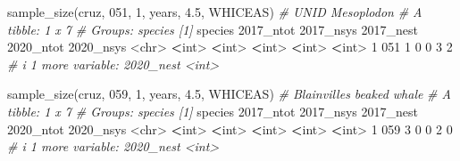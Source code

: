 \documentclass[
]{book}
\newenvironment{Shaded}{\begin{snugshade}}{\end{snugshade}}
\newcommand{\AttributeTok}[1]{\textcolor[rgb]{0.77,0.63,0.00}{#1}}
\newcommand{\CommentTok}[1]{\textcolor[rgb]{0.56,0.35,0.01}{\textit{#1}}}
\newcommand{\DecValTok}[1]{\textcolor[rgb]{0.00,0.00,0.81}{#1}}
\newcommand{\ErrorTok}[1]{\textcolor[rgb]{0.64,0.00,0.00}{\textbf{#1}}}
\newcommand{\FloatTok}[1]{\textcolor[rgb]{0.00,0.00,0.81}{#1}}
\newcommand{\FunctionTok}[1]{\textcolor[rgb]{0.00,0.00,0.00}{#1}}
\newcommand{\NormalTok}[1]{#1}
\newcommand{\SpecialCharTok}[1]{\textcolor[rgb]{0.00,0.00,0.00}{#1}}
\newcommand{\StringTok}[1]{\textcolor[rgb]{0.31,0.60,0.02}{#1}}
\begin{document}
\begin{Shaded}
\begin{Highlighting}[]
\FunctionTok{sample\_size}\NormalTok{(cruz, }\StringTok{\textquotesingle{}051\textquotesingle{}}\NormalTok{, }\DecValTok{1}\NormalTok{, years, }\FloatTok{4.5}\NormalTok{, }\StringTok{\textquotesingle{}WHICEAS\textquotesingle{}}\NormalTok{) }\CommentTok{\# UNID Mesoplodon}
\CommentTok{\# A tibble: 1 x 7}
\CommentTok{\# Groups:   species [1]}
\NormalTok{  species }\StringTok{\textasciigrave{}}\AttributeTok{2017\_ntot}\StringTok{\textasciigrave{}} \StringTok{\textasciigrave{}}\AttributeTok{2017\_nsys}\StringTok{\textasciigrave{}} \StringTok{\textasciigrave{}}\AttributeTok{2017\_nest}\StringTok{\textasciigrave{}} \StringTok{\textasciigrave{}}\AttributeTok{2020\_ntot}\StringTok{\textasciigrave{}} \StringTok{\textasciigrave{}}\AttributeTok{2020\_nsys}\StringTok{\textasciigrave{}}
  \SpecialCharTok{\textless{}}\NormalTok{chr}\SpecialCharTok{\textgreater{}}         \ErrorTok{\textless{}}\NormalTok{int}\SpecialCharTok{\textgreater{}}       \ErrorTok{\textless{}}\NormalTok{int}\SpecialCharTok{\textgreater{}}       \ErrorTok{\textless{}}\NormalTok{int}\SpecialCharTok{\textgreater{}}       \ErrorTok{\textless{}}\NormalTok{int}\SpecialCharTok{\textgreater{}}       \ErrorTok{\textless{}}\NormalTok{int}\SpecialCharTok{\textgreater{}}
\DecValTok{1} \DecValTok{051}               \DecValTok{1}           \DecValTok{0}           \DecValTok{0}           \DecValTok{3}           \DecValTok{2}
\CommentTok{\# i 1 more variable: \textasciigrave{}2020\_nest\textasciigrave{} \textless{}int\textgreater{}}

\FunctionTok{sample\_size}\NormalTok{(cruz, }\StringTok{\textquotesingle{}059\textquotesingle{}}\NormalTok{, }\DecValTok{1}\NormalTok{, years, }\FloatTok{4.5}\NormalTok{, }\StringTok{\textquotesingle{}WHICEAS\textquotesingle{}}\NormalTok{) }\CommentTok{\# Blainville\textquotesingle{}s beaked whale}
\CommentTok{\# A tibble: 1 x 7}
\CommentTok{\# Groups:   species [1]}
\NormalTok{  species }\StringTok{\textasciigrave{}}\AttributeTok{2017\_ntot}\StringTok{\textasciigrave{}} \StringTok{\textasciigrave{}}\AttributeTok{2017\_nsys}\StringTok{\textasciigrave{}} \StringTok{\textasciigrave{}}\AttributeTok{2017\_nest}\StringTok{\textasciigrave{}} \StringTok{\textasciigrave{}}\AttributeTok{2020\_ntot}\StringTok{\textasciigrave{}} \StringTok{\textasciigrave{}}\AttributeTok{2020\_nsys}\StringTok{\textasciigrave{}}
  \SpecialCharTok{\textless{}}\NormalTok{chr}\SpecialCharTok{\textgreater{}}         \ErrorTok{\textless{}}\NormalTok{int}\SpecialCharTok{\textgreater{}}       \ErrorTok{\textless{}}\NormalTok{int}\SpecialCharTok{\textgreater{}}       \ErrorTok{\textless{}}\NormalTok{int}\SpecialCharTok{\textgreater{}}       \ErrorTok{\textless{}}\NormalTok{int}\SpecialCharTok{\textgreater{}}       \ErrorTok{\textless{}}\NormalTok{int}\SpecialCharTok{\textgreater{}}
\DecValTok{1} \DecValTok{059}               \DecValTok{3}           \DecValTok{0}           \DecValTok{0}           \DecValTok{2}           \DecValTok{0}
\CommentTok{\# i 1 more variable: \textasciigrave{}2020\_nest\textasciigrave{} \textless{}int\textgreater{}}


\end{Highlighting}
\end{Shaded}
\end{document}
